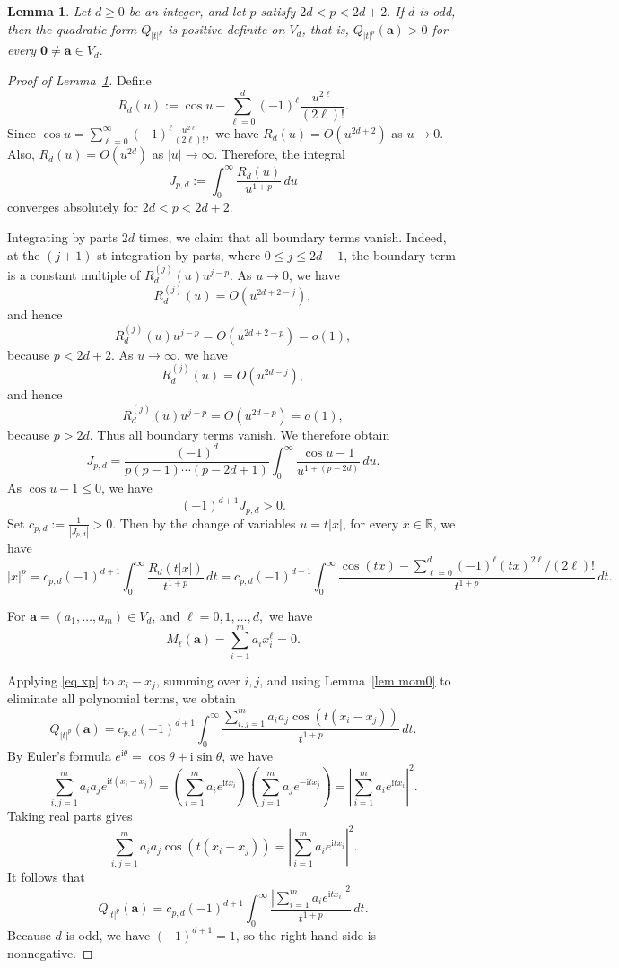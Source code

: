 \documentclass[11pt]{article}
\newtheorem{lemma}[theorem]{Lemma}
\theoremstyle{definition}
\newcommand{\ii}{\mathrm{i}}
\begin{document}
\begin{lemma}\label{lem odd d}
	Let $d\ge 0$ be an integer, and let $p$ satisfy
	\(
	2d<p<2d+2.
	\)
	If $d$ is odd, then the quadratic form $Q_{|t|^p}$ is positive
	definite on $V_d$, that is,
	\(
	Q_{|t|^p}(\boldsymbol{a})>0\) for every 
	\(\boldsymbol{0}\ne \boldsymbol{a}\in V_d.
	\)
\end{lemma}
\begin{proof}[Proof of Lemma~\ref{lem odd d}]
	Define
	\[
	R_d(u):=\cos u-\sum_{\ell=0}^d(-1)^\ell\frac{u^{2\ell}}{(2\ell)!}.
	\]
	Since
	\(
	\cos u=\sum_{\ell=0}^{\infty}(-1)^\ell\frac{u^{2\ell}}{(2\ell)!},
	\)
	we have $R_d(u)=O(u^{2d+2})$ as $u\to 0$.
	Also, $R_d(u)=O(u^{2d})$ as $|u|\to\infty$. Therefore, the integral
	\[
	J_{p,d}:=\int_0^\infty \frac{R_d(u)}{u^{1+p}}\,du
	\]
	converges absolutely for $2d<p<2d+2$.
	
	Integrating by parts \(2d\) times, we claim that all boundary terms vanish.
Indeed, at the \((j+1)\)-st integration by parts, where \(0\le j\le 2d-1\),
the boundary term is a constant multiple of
\(
R_d^{(j)}(u)u^{j-p}.
\)
As \(u\to0\), we have
\[
R_d^{(j)}(u)=O(u^{2d+2-j}),
\]
and hence
\[
R_d^{(j)}(u)u^{j-p}=O(u^{2d+2-p})=o(1),
\]
because \(p<2d+2\).  As \(u\to\infty\), we have
\[
R_d^{(j)}(u)=O(u^{2d-j}),
\]
and hence
\[
R_d^{(j)}(u)u^{j-p}=O(u^{2d-p})=o(1),
\]
because \(p>2d\). Thus all boundary terms vanish. We therefore obtain
\[
J_{p,d}
=
\frac{(-1)^d}{p(p-1)\cdots(p-2d+1)}
\int_0^\infty \frac{\cos u-1}{u^{1+(p-2d)}}\,du.
\]
	As $\cos u-1\le 0$, we have
	\[
	(-1)^{d+1}J_{p,d}>0.
	\]
	Set
	\(
	c_{p,d}:=\frac{1}{|J_{p,d}|}>0.
	\)
	Then by the change of variables $u=t|x|$, for every $x\in\mathbb R$, we have
	\begin{equation}\label{eq xp}
		|x|^p
		=
		c_{p,d}(-1)^{d+1}
		\int_0^\infty
		\frac{
			R_d(t|x|)
		}{t^{1+p}}\,dt
		=
		c_{p,d}(-1)^{d+1}
		\int_0^\infty
		\frac{
			\cos(tx)-\sum_{\ell=0}^d(-1)^\ell (tx)^{2\ell}/(2\ell)!
		}{t^{1+p}}\,dt.
	\end{equation}
	
	For $\boldsymbol{a}=(a_1,\dots,a_m)\in V_d$, and \(\ell=0,1,\ldots,d,\) we have
	\[
	M_\ell(\boldsymbol{a})=\sum_{i=1}^m a_i x_i^\ell=0.
	\]
	
	Applying \eqref{eq xp} to $x_i-x_j$, summing over $i,j$, and using
	Lemma~\ref{lem mom0} to eliminate all polynomial terms, we obtain
	\[
	Q_{|t|^p}(\boldsymbol{a})
	=
	c_{p,d}(-1)^{d+1}
	\int_0^\infty
	\frac{
		\sum_{i,j=1}^m a_i a_j \cos(t(x_i-x_j))
	}{t^{1+p}}\,dt.
	\]
	By Euler's formula $e^{\ii \theta}=\cos \theta+\ii \sin \theta$, we have
	\[
	\sum_{i,j=1}^m a_i a_j e^{\ii t(x_i-x_j)}
	=
	\left(\sum_{i=1}^m a_i e^{\ii tx_i}\right)
	\left(\sum_{j=1}^m a_j e^{-\ii tx_j}\right)
	=
	\left|\sum_{i=1}^m a_i e^{\ii tx_i}\right|^2.
	\]
	Taking real parts gives
	\[
	\sum_{i,j=1}^m a_i a_j \cos(t(x_i-x_j))
	=
	\left|\sum_{i=1}^m a_i e^{\ii tx_i}\right|^2.
	\]
	It follows that
	\begin{equation}\label{eq Qp}
		Q_{|t|^p}(\boldsymbol{a})
		=
		c_{p,d}(-1)^{d+1}
		\int_0^\infty
		\frac{
			\left|\sum_{i=1}^m a_i e^{\ii tx_i}\right|^2
		}{t^{1+p}}\,dt.
	\end{equation}
	Because $d$ is odd, we have $(-1)^{d+1}=1$, so the right hand side is nonnegative.
	

\end{proof}
\end{document}
